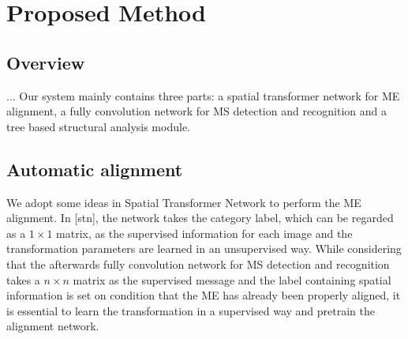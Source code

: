 \documentclass[10pt,conference,a4paper]{IEEEtran}
\begin{document}
	\section{Proposed Method}
	\subsection{Overview}
	...
	Our system mainly contains three parts: a spatial transformer network for ME alignment, a fully convolution network for MS detection and recognition and a tree based structural analysis module.
	\subsection{Automatic alignment}
	We adopt some ideas in Spatial Transformer Network to perform the ME alignment. In [stn], the network takes the category label, which can be regarded as a $1 \times 1$ matrix, as the supervised information for each image and the transformation parameters are learned in an unsupervised way. While considering that the afterwards fully convolution network for MS detection and recognition takes a $n \times n$ matrix as the supervised message and the label containing spatial information is set on condition that the ME has already been properly aligned, it is essential to learn the transformation in a supervised way and pretrain the alignment network.
	
\end{document}
